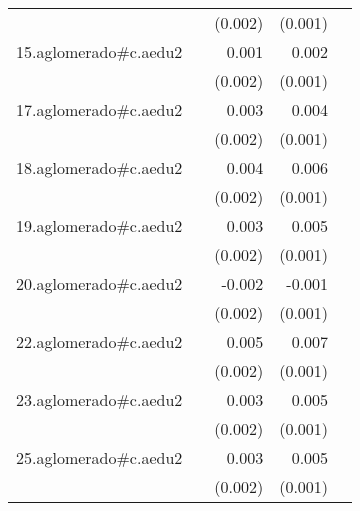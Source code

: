 {\begin{longtable}{l*{4}{D{.}{.}{-1}}}
            &                     &     (0.002)         &     (0.001)         &                     \\
\addlinespace
15.aglomerado#c.aedu2&                     &       0.001         &       0.002         &                     \\
            &                     &     (0.002)         &     (0.001)         &                     \\
\addlinespace
17.aglomerado#c.aedu2&                     &       0.003         &       0.004\sym{***}&                     \\
            &                     &     (0.002)         &     (0.001)         &                     \\
\addlinespace
18.aglomerado#c.aedu2&                     &       0.004\sym{*}  &       0.006\sym{***}&                     \\
            &                     &     (0.002)         &     (0.001)         &                     \\
\addlinespace
19.aglomerado#c.aedu2&                     &       0.003         &       0.005\sym{***}&                     \\
            &                     &     (0.002)         &     (0.001)         &                     \\
\addlinespace
20.aglomerado#c.aedu2&                     &      -0.002         &      -0.001         &                     \\
            &                     &     (0.002)         &     (0.001)         &                     \\
\addlinespace
22.aglomerado#c.aedu2&                     &       0.005\sym{*}  &       0.007\sym{***}&                     \\
            &                     &     (0.002)         &     (0.001)         &                     \\
\addlinespace
23.aglomerado#c.aedu2&                     &       0.003         &       0.005\sym{***}&                     \\
            &                     &     (0.002)         &     (0.001)         &                     \\
\addlinespace
25.aglomerado#c.aedu2&                     &       0.003         &       0.005\sym{***}&                     \\
            &                     &     (0.002)         &     (0.001)         &                     \\

\end{longtable}}
